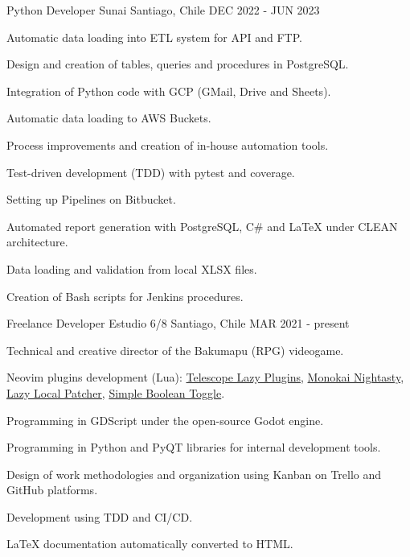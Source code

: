 

\begin{cventries}
	
\cventry
{Python Developer} %
{Sunai} %
{Santiago, Chile} %
{DEC 2022 - JUN 2023} %
{
	\begin{cvitems} %
		\item {Automatic data loading into ETL system for API and FTP.}
		\item {Design and creation of tables, queries and procedures in PostgreSQL.}
		\item {Integration of Python code with GCP (GMail, Drive and Sheets).}
		\item {Automatic data loading to AWS Buckets.}
		\item {Process improvements and creation of in-house automation tools.}
        \item {Test-driven development (TDD) with pytest and coverage.}
		\item {Setting up Pipelines on Bitbucket.}
		\item {Automated report generation with PostgreSQL, C\# and LaTeX under CLEAN architecture.}
        \item {Data loading and validation from local XLSX files.}
		\item {Creation of Bash scripts for Jenkins procedures.}
	\end{cvitems}
}

  \cventry
    {Freelance Developer} %
    {Estudio 6/8} %
    {Santiago, Chile} %
    {MAR 2021 - present} %
    {
      \begin{cvitems} %
        \item {Technical and creative director of the Bakumapu (RPG) videogame.}
        \item {Neovim plugins development (Lua):
          \href{https://github.com/polirritmico/telescope-lazy-plugins.nvim}{Telescope Lazy Plugins},
          \href{https://github.com/polirritmico/monokai-nightasty.nvim}{Monokai Nightasty}},
          \href{https://github.com/polirritmico/lazy-local-patcher.nvim}{Lazy Local Patcher},
          \href{https://github.com/polirritmico/simple-boolean-toggle.nvim}{Simple Boolean Toggle}.
        \item {Programming in GDScript under the open-source Godot engine.}
        \item {Programming in Python and PyQT libraries for internal development tools.}
        \item {Design of work methodologies and organization using Kanban on Trello and GitHub platforms.}
        \item {Development using TDD and CI/CD.}
        \item {LaTeX documentation automatically converted to HTML.} 
      \end{cvitems}
    }


\end{cventries}
